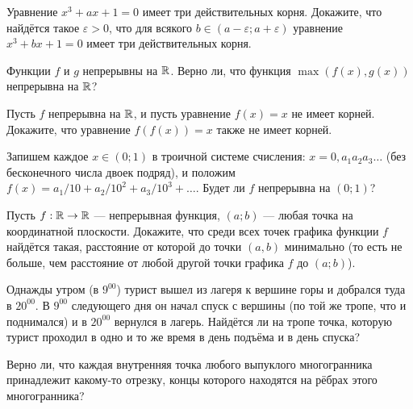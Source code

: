 \documentclass[a4paper,12pt]{article}
\begin{document}


 Уравнение $x^3+ax+1=0$ имеет три действительных корня.
Докажите, что найд\"ется такое $\varepsilon>0$, что для всякого
$b\in(a-\varepsilon;a+\varepsilon)$ уравнение $x^3+bx+1=0$ имеет три
действительных корня.

Функции $f$ и $g$ непрерывны на $\mathbb{R}$.
Верно ли, что функция $\max(f(x),g(x))$
непрерывна на $\mathbb{R}$?

Пусть $f$ непрерывна на $\mathbb{R}$,  и пусть уравнение $f(x)=x$ не имеет корней.
Докажите, что уравнение $f(f(x))=x$ также не имеет корней.

Запишем каждое  $x\in(0;1)$ в троичной системе счисления:
$x=0,a_1a_2a_3\dots$
(без бесконечного числа двоек подряд),
и положим
$f(x)=a_1/10+a_2/10^2+a_3/10^3+\dots.$ Будет ли %
$f$  непрерывна на $(0;1)$?

Пусть $f:\mathbb{R}\rightarrow\mathbb{R}$ --- непрерывная функция, $(a;b)$ --- любая точка
на координатной плоскости. Докажите, что среди всех точек графика функции $f$
найд\"ется такая, расстояние от которой до точки $(a,b)$ минимально
(то есть не больше, чем расстояние от любой другой точки графика $f$ до
$(a;b)$).


Однажды утром (в $9^{00}$) турист
вышел из лагеря к вершине горы и добрался туда в $20^{00}$.
В $9^{00}$ следующего дня он начал спуск с вершины (по той же тропе,
что и поднимался) и в $20^{00}$ вернулся в лагерь.
Найд\"ется ли на тропе точка, которую турист
проходил в одно и то же время %
в день подъ\"ема и в день спуска?


 Верно ли, что каждая внутренняя точка любого выпуклого многогранника
принадлежит какому-то отрезку, концы которого находятся на р\"ебрах этого
многогранника?
\end{document}
